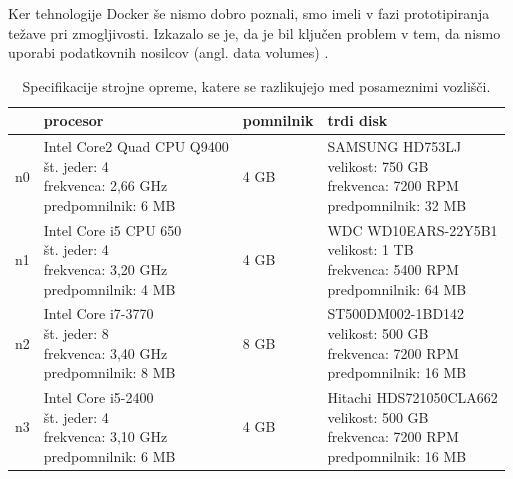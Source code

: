 \documentclass[a4paper, 12pt]{book}
\begin{document}
Ker tehnologije Docker še nismo dobro poznali, smo imeli v fazi prototipiranja težave pri zmogljivosti. Izkazalo se je, da je bil ključen problem v tem, da nismo uporabi podatkovnih nosilcov (angl. data volumes) \cite{docker-storage-layers}.

\begin{table}[H]
\begin{center}
\begin{tabular}{ l|l|l|l } 
 & \textbf{procesor} & \textbf{pomnilnik} & \textbf{trdi disk} \\
\hline
n0 & \makecell[l]{Intel Core2 Quad CPU Q9400\\št. jeder: 4\\frekvenca: 2,66 GHz\\predpomnilnik: 6 MB} & 4 GB & \makecell[l]{SAMSUNG HD753LJ\\velikost: 750 GB\\frekvenca: 7200 RPM\\predpomnilnik: 32 MB} \\
\hline
n1 & \makecell[l]{Intel Core i5 CPU 650\\št. jeder: 4\\frekvenca: 3,20 GHz\\predpomnilnik: 4 MB} & 4 GB & \makecell[l]{WDC WD10EARS-22Y5B1\\velikost: 1 TB\\frekvenca: 5400 RPM\\predpomnilnik: 64 MB} \\
\hline
n2 & \makecell[l]{Intel Core i7-3770\\št. jeder: 8\\frekvenca: 3,40 GHz\\predpomnilnik: 8 MB} & 8 GB & \makecell[l]{ST500DM002-1BD142\\velikost: 500 GB\\frekvenca: 7200 RPM\\predpomnilnik: 16 MB} \\
\hline
n3 & \makecell[l]{Intel Core i5-2400\\št. jeder: 4\\frekvenca:  3,10 GHz \\predpomnilnik: 6 MB} & 4 GB & \makecell[l]{Hitachi HDS721050CLA662\\velikost: 500 GB\\frekvenca: 7200 RPM\\predpomnilnik: 16 MB} \\
\end{tabular}
\end{center}
\caption{Specifikacije strojne opreme, katere se razlikujejo med posameznimi vozlišči.}
\label{tbl_benchmarking_nodes_hw}
\end{table}
\end{document}

